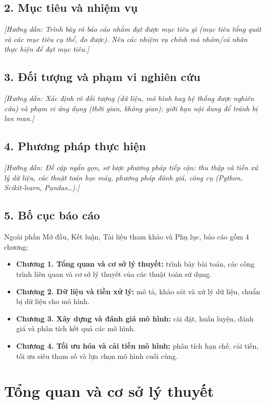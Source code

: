 \documentclass[12pt,a4paper,oneside]{report}
\newcommand{\huongdan}[1]{{\color{guide}\itshape [Hướng dẫn: #1]}}
\begin{document}
\section*{2. Mục tiêu và nhiệm vụ}
\huongdan{Trình bày rõ báo cáo nhằm đạt được mục tiêu gì (mục tiêu tổng
quát và các mục tiêu cụ thể, đo được). Nêu các nhiệm vụ chính mà nhóm/cá
nhân thực hiện để đạt mục tiêu.}

\section*{3. Đối tượng và phạm vi nghiên cứu}
\huongdan{Xác định rõ đối tượng (dữ liệu, mô hình hay hệ thống được nghiên
cứu) và phạm vi ứng dụng (thời gian, không gian); giới hạn nội dung để tránh
bị lan man.}

\section*{4. Phương pháp thực hiện}
\huongdan{Đề cập ngắn gọn, sơ lược phương pháp tiếp cận: thu thập và tiền xử lý dữ liệu,
các thuật toán học máy, phương pháp đánh giá, công cụ (Python, Scikit-learn,
Pandas\dots).}

\section*{5. Bố cục báo cáo}
Ngoài phần Mở đầu, Kết luận, Tài liệu tham khảo và Phụ lục, báo cáo gồm
4 chương:
\begin{itemize}
  \item \textbf{Chương 1. Tổng quan và cơ sở lý thuyết:} trình bày bài toán,
        các công trình liên quan và cơ sở lý thuyết của các thuật toán sử dụng.
  \item \textbf{Chương 2. Dữ liệu và tiền xử lý:} mô tả, khảo sát và xử lý
        dữ liệu, chuẩn bị dữ liệu cho mô hình.
  \item \textbf{Chương 3. Xây dựng và đánh giá mô hình:} cài đặt, huấn luyện,
        đánh giá và phân tích kết quả các mô hình.
  \item \textbf{Chương 4. Tối ưu hóa và cải tiến mô hình:} phân tích hạn chế,
        cải tiến, tối ưu siêu tham số và lựa chọn mô hình cuối cùng.
\end{itemize}

\chapter{Tổng quan và cơ sở lý thuyết}
\label{chap:tongquan}
\end{document}
